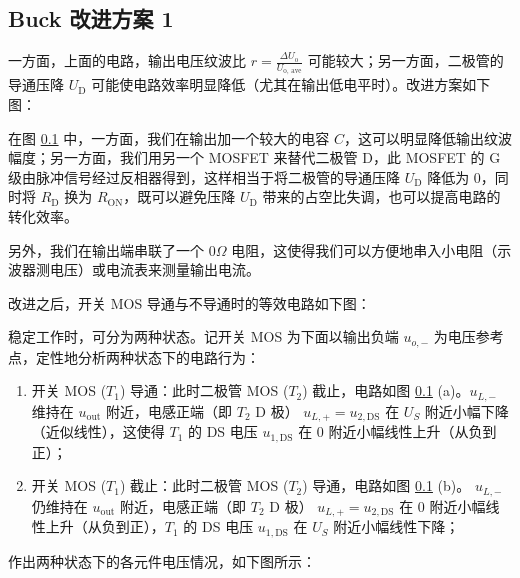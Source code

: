 \documentclass[UTF8]{report}
\theoremstyle{MyLineTheoremStyle} %
\theoremstyle{MyBlockTheoremStyle} %
\theoremstyle{MySubsubsectionStyle} %
\begin{document}
\subsection{Buck 改进方案 1}
一方面，上面的电路，输出电压纹波比 $r = \frac{\Delta U_{\text{o}}}{U_{\text{o, ave}}}$ 可能较大；另一方面，二极管的导通压降 $U_\text{D}$ 可能使电路效率明显降低（尤其在输出低电平时）。改进方案如下图：
\begin{figure}[H]\centering
    \caption{}
\end{figure}
在图 \ref{} 中，一方面，我们在输出加一个较大的电容 $C$，这可以明显降低输出纹波幅度；另一方面，我们用另一个 MOSFET 来替代二极管 D，此 MOSFET 的 G 级由脉冲信号经过反相器得到，这样相当于将二极管的导通压降 $U_\text{D}$ 降低为 $0$，同时将 $R_{\text{D}}$ 换为 $R_{\text{ON}}$，既可以避免压降 $U_{\text{D}}$ 带来的占空比失调，也可以提高电路的转化效率。


另外，我们在输出端串联了一个 $0 \Omega$ 电阻，这使得我们可以方便地串入小电阻（示波器测电压）或电流表来测量输出电流。

改进之后，开关 MOS 导通与不导通时的等效电路如下图：
\begin{figure}[H]\centering
\begin{subfigure}[b]{0.5\columnwidth}\centering
    \caption{}
\end{subfigure}\hfill
\begin{subfigure}[b]{0.5\columnwidth}\centering
    \caption{}
\end{subfigure}
\caption{}
\end{figure}

稳定工作时，可分为两种状态。记开关 MOS 为下面以输出负端 $u_{o, -}$ 为电压参考点，定性地分析两种状态下的电路行为：
\begin{enumerate}
\item 开关 MOS ($T_1$) 导通：此时二极管 MOS ($T_2$) 截止，电路如图 \ref{} (a)。$u_{L, -}$ 维持在 $u_\text{out}$ 附近，电感正端（即 $T_2$ D 极）
$u_{L, +} = u_{2, \text{DS}}$ 在 $U_S$ 附近小幅下降（近似线性），这使得 $T_1$ 的 DS 电压 $u_{1, \text{DS}}$ 在 0 附近小幅线性上升（从负到正）；
\item 开关 MOS ($T_1$) 截止：此时二极管 MOS ($T_2$) 导通，电路如图 \ref{} (b)。
$u_{L, -}$ 仍维持在 $u_\text{out}$ 附近，电感正端（即 $T_2$ D 极）
$u_{L, +} = u_{2, \text{DS}}$ 在 $0$ 附近小幅线性上升（从负到正），$T_1$ 的 DS 电压 $u_{1, \text{DS}}$ 在 $U_S$ 附近小幅线性下降；
\end{enumerate}
作出两种状态下的各元件电压情况，如下图所示：
\end{document}
